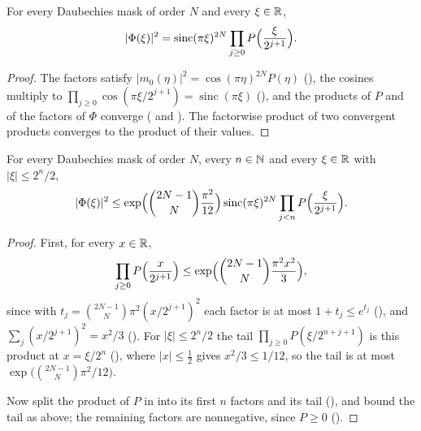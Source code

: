 \begin{proposition}
\label{prop:daub-symbol-product-modulus}
\leanok
{}
For every Daubechies mask of order $N$ and every $\xi \in \mathbb{R}$,
\[
  |\Phi(\xi)|^2
  = \operatorname{sinc}(\pi\xi)^{2N} \prod_{j \geq 0} P\Bigl(\frac{\xi}{2^{j+1}}\Bigr) .
\]
\end{proposition}

\begin{proof}
\leanok
{}
The factors satisfy $|m_0(\eta)|^2 = \cos(\pi\eta)^{2N} P(\eta)$
(), the cosines multiply to
$\prod_{j \geq 0} \cos(\pi\xi/2^{j+1}) = \operatorname{sinc}(\pi\xi)$
(), and the products of $P$ and of the factors of $\Phi$ converge
( and ). The factorwise product of
two convergent products converges to the product of their values.
\end{proof}

\begin{proposition}
\label{prop:daub-symbol-product-bound}
\leanok
{}
For every Daubechies mask of order $N$, every $n \in \mathbb{N}$ and every $\xi \in \mathbb{R}$ with
$|\xi| \leq 2^n/2$,
\[
  |\Phi(\xi)|^2 \leq \exp\Bigl(\binom{2N-1}{N} \frac{\pi^2}{12}\Bigr)
  \operatorname{sinc}(\pi\xi)^{2N} \prod_{j<n} P\Bigl(\frac{\xi}{2^{j+1}}\Bigr) .
\]
\end{proposition}

\begin{proof}
\leanok
{}
First, for every $x \in \mathbb{R}$,
\[
  \prod_{j \geq 0} P\Bigl(\frac{x}{2^{j+1}}\Bigr)
  \leq \exp\Bigl(\binom{2N-1}{N} \frac{\pi^2 x^2}{3}\Bigr) ,
\]
since with $t_j = \binom{2N-1}{N} \pi^2 (x/2^{j+1})^2$ each factor is at most
$1 + t_j \leq e^{t_j}$ (), and $\sum_j (x/2^{j+1})^2 = x^2/3$
(). For $|\xi| \leq 2^n/2$ the tail $\prod_{j \geq 0} P(\xi/2^{n+j+1})$
is this product at $x = \xi/2^n$ (), where $|x| \leq \frac12$ gives
$x^2/3 \leq 1/12$, so the tail is at most $\exp\bigl(\binom{2N-1}{N} \pi^2/12\bigr)$.

Now split the product of $P$ in  into its first $n$
factors and its tail (), and bound the tail as above; the remaining
factors are nonnegative, since $P \geq 0$ ().
\end{proof}

